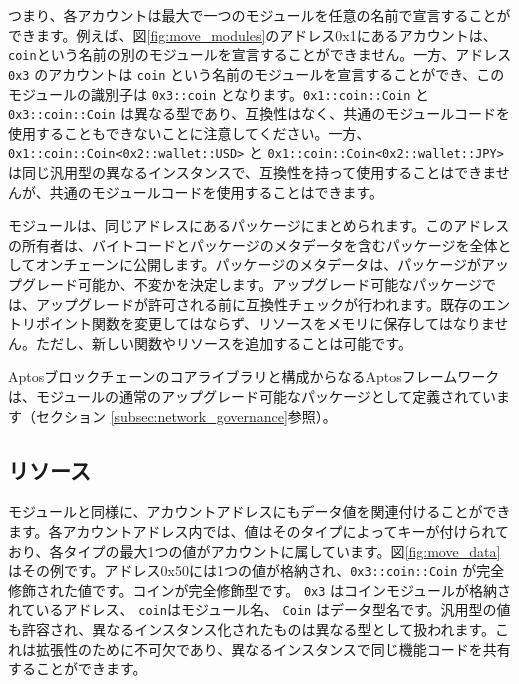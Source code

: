 \documentclass{article}
\begin{document}
つまり、各アカウントは最大で一つのモジュールを任意の名前で宣言することができます。例えば、図\ref{fig:move_modules}のアドレス0x1にあるアカウントは、\texttt{coin}という名前の別のモジュールを宣言することができません。一方、アドレス  \texttt{0x3} のアカウントは \texttt{coin} という名前のモジュールを宣言することができ、このモジュールの識別子は \texttt{0x3::coin} となります。\texttt{0x1::coin::Coin} と  \texttt{0x3::coin::Coin} は異なる型であり、互換性はなく、共通のモジュールコードを使用することもできないことに注意してください。一方、\texttt{0x1::coin::Coin<0x2::wallet::USD>} と  \texttt{0x1::coin::Coin<0x2::wallet::JPY>}  は同じ汎用型の異なるインスタンスで、互換性を持って使用することはできませんが、共通のモジュールコードを使用することはできます。

モジュールは、同じアドレスにあるパッケージにまとめられます。このアドレスの所有者は、バイトコードとパッケージのメタデータを含むパッケージを全体としてオンチェーンに公開します。パッケージのメタデータは、パッケージがアップグレード可能か、不変かを決定します。アップグレード可能なパッケージでは、アップグレードが許可される前に互換性チェックが行われます。既存のエントリポイント関数を変更してはならず、リソースをメモリに保存してはなりません。ただし、新しい関数やリソースを追加することは可能です。

Aptosブロックチェーンのコアライブラリと構成からなるAptosフレームワークは、モジュールの通常のアップグレード可能なパッケージとして定義されています（セクション \ref{subsec:network_governance}参照）。

\subsection{リソース} 
\label{subsec:resources}

モジュールと同様に、アカウントアドレスにもデータ値を関連付けることができます。各アカウントアドレス内では、値はそのタイプによってキーが付けられており、各タイプの最大1つの値がアカウントに属しています。図\ref{fig:move_data} はその例です。アドレス0x50には1つの値が格納され、\texttt{0x3::coin::Coin} が完全修飾された値です。コインが完全修飾型です。 \texttt{0x3} はコインモジュールが格納されているアドレス、 \texttt{coin}はモジュール名、 \texttt{Coin} はデータ型名です。汎用型の値も許容され、異なるインスタンス化されたものは異なる型として扱われます。これは拡張性のために不可欠であり、異なるインスタンスで同じ機能コードを共有することができます。
\end{document}
